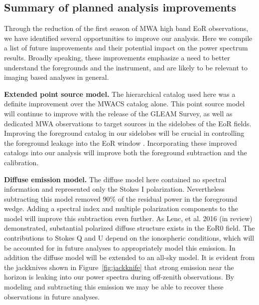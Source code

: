 \documentclass[iop]{emulateapj}
\begin{document}
\subsection{Summary of planned analysis improvements}
Through the reduction of the first season of MWA high band EoR observations, we have
identified several opportunities to improve our analysis. Here we compile a list of future
improvements and their potential impact on the power spectrum results. Broadly speaking,
these improvements emphasize a need to better understand the foregrounds and the 
instrument, and are likely to be relevant to imaging based analyses in general.

\textbf{Extended point source model.} The hierarchical catalog used here was a definite
improvement over the MWACS catalog alone. This point source model will continue
to improve with the release of the GLEAM Survey, as well as dedicated MWA observations 
to target sources in the sidelobes of the EoR fields. Improving the foreground catalog
in our sidelobes will be crucial in controlling the foreground leakage into the EoR window
\citep{Pober:2016}. Incorporating these improved catalogs
into our analysis will improve both the foreground subtraction and the calibration.

\textbf{Diffuse emission model.} The diffuse model here contained no spectral information
and represented only the Stokes I polarization. Nevertheless subtracting this model removed
90\% of the residual power in the foreground wedge. Adding a spectral index and multiple
polarization components to the model will improve this subtraction even further.
As Lenc, et al. 2016 (in review) demonstrated, substantial polarized diffuse structure
exists in the EoR0 field. The contributions to Stokes Q and U depend on the ionospheric
conditions, which will be accounted for in future analyses to appropriately model this
emission. 
In addition the diffuse model will be extended to an all-sky model. It is evident from the
jackknives shown in Figure~\ref{fig:jackknife} that strong emission near the horizon is
leaking into our power spectra during off-zenith observations. By modeling and subtracting
this emission we may be able to recover these observations in future analyses.
\end{document}
